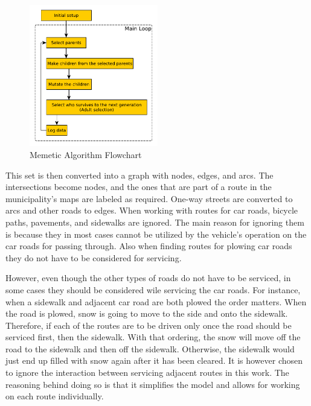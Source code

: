 \begin{figure}
    \begin{center}
        \includegraphics[width=0.5\textwidth]{figures/Architecture/MA_flowchart.pdf}
    \end{center}
    \caption{Memetic Algorithm Flowchart}
    \label{fig:ma_flowchart}
\end{figure}

This set is then converted into a graph with nodes, edges, and arcs. The intersections become nodes, and the ones that are part of a route in the municipality's maps are labeled as required. One-way streets are converted to arcs and other roads to edges. When working with routes for car roads, bicycle paths, pavements, and sidewalks are ignored. The main reason for ignoring them is because they in most cases cannot be utilized by the vehicle's operation on the car roads for passing through. Also when finding routes for plowing car roads they do not have to be considered for servicing.

However, even though the other types of roads do not have to be serviced, in some cases they should be considered wile servicing the car roads. For instance, when a sidewalk and adjacent car road are both plowed the order matters. When the road is plowed, snow is going to move to the side and onto the sidewalk. Therefore, if each of the routes are to be driven only once the road should be serviced first, then the sidewalk. With that ordering, the snow will move off the road to the sidewalk and then off the sidewalk. Otherwise, the sidewalk would just end up filled with snow again after it has been cleared. It is however chosen to ignore the interaction between servicing adjacent routes in this work. The reasoning behind doing so is that it simplifies the model and allows for working on each route individually.

